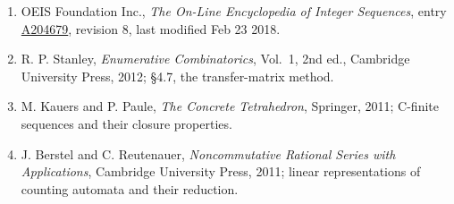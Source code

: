 \documentclass[11pt]{article}
\theoremstyle{definition}
\begin{document}
\begin{enumerate}

\item OEIS Foundation Inc., \emph{The On-Line Encyclopedia of Integer Sequences}, entry \href{https://oeis.org/A204679}{A204679}, revision 8, last modified Feb 23 2018.

\item R. P. Stanley, \emph{Enumerative Combinatorics}, Vol.~1, 2nd ed., Cambridge University Press, 2012; \S4.7, the transfer-matrix method.

\item M. Kauers and P. Paule, \emph{The Concrete Tetrahedron}, Springer, 2011; C-finite sequences and their closure properties.

\item J. Berstel and C. Reutenauer, \emph{Noncommutative Rational Series with Applications}, Cambridge University Press, 2011; linear representations of counting automata and their reduction.

\end{enumerate}
\end{document}

